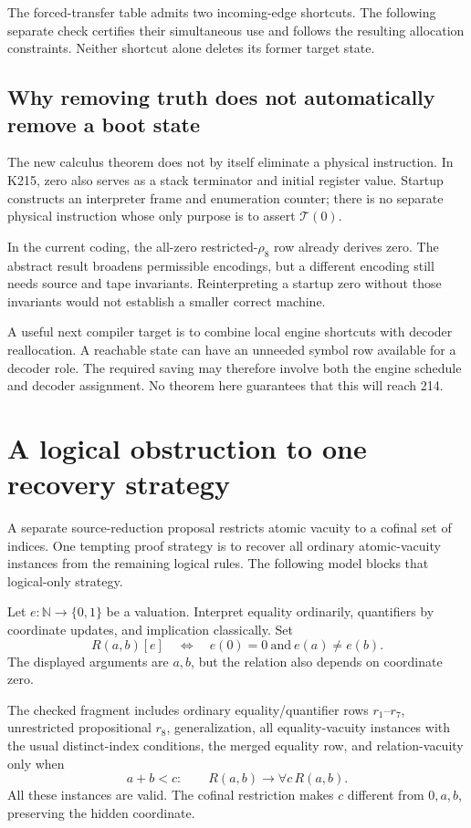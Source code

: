 \documentclass[11pt]{article}
\theoremstyle{definition}\newtheorem{definition}[theorem]{Definition}
\newcommand{\T}{\mathcal T}
\begin{document}
The forced-transfer table admits two incoming-edge shortcuts. The following separate check certifies their simultaneous use and follows the resulting allocation constraints. Neither shortcut alone deletes its former target state.


\subsection{Why removing truth does not automatically remove a boot state}
The new calculus theorem does not by itself eliminate a physical instruction. In K215, zero also serves as a stack terminator and initial register value. Startup constructs an interpreter frame and enumeration counter; there is no separate physical instruction whose only purpose is to assert $\T(0)$.

In the current coding, the all-zero restricted-$\rho_8$ row already derives zero. The abstract result broadens permissible encodings, but a different encoding still needs source and tape invariants. Reinterpreting a startup zero without those invariants would not establish a smaller correct machine.

A useful next compiler target is to combine local engine shortcuts with decoder reallocation. A reachable state can have an unneeded symbol row available for a decoder role. The required saving may therefore involve both the engine schedule and decoder assignment. No theorem here guarantees that this will reach 214.

\section{A logical obstruction to one recovery strategy}
A separate source-reduction proposal restricts atomic vacuity to a cofinal set of indices. One tempting proof strategy is to recover all ordinary atomic-vacuity instances from the remaining logical rules. The following model blocks that logical-only strategy.

Let $e:\mathbb N\to\{0,1\}$ be a valuation. Interpret equality ordinarily, quantifiers by coordinate updates, and implication classically. Set
\[
 R(a,b)[e]\quad\Longleftrightarrow\quad e(0)=0\ \text{and}\ e(a)\ne e(b).
\]
The displayed arguments are $a,b$, but the relation also depends on coordinate zero.

The checked fragment includes ordinary equality/quantifier rows $r_1$--$r_7$, unrestricted propositional $r_8$, generalization, all equality-vacuity instances with the usual distinct-index conditions, the merged equality row, and relation-vacuity only when
\[
 a+b<c:\qquad R(a,b)\to\forall c\,R(a,b).
\]
All these instances are valid. The cofinal restriction makes $c$ different from $0,a,b$, preserving the hidden coordinate.
\end{document}
